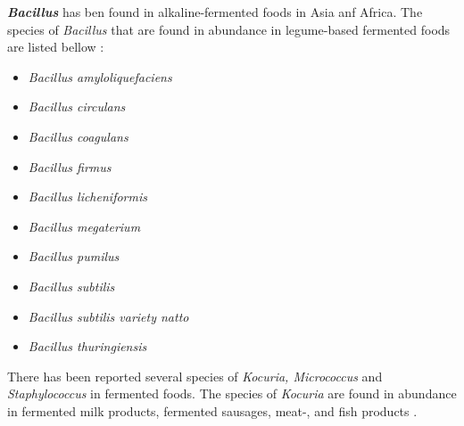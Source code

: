 \textbf{\textit{Bacillus}} has ben found in alkaline-fermented foods in Asia anf Africa. The species of \textit{Bacillus} that are found in abundance in legume-based fermented foods are listed bellow \cite*{L1-DiversityMicro}:

\begin{highlight}
    \begin{multicols}{3}
        \begin{itemize}
            \item \textit{Bacillus amyloliquefaciens}
            \item \textit{Bacillus circulans}
            \item \textit{Bacillus coagulans}
            \item \textit{Bacillus firmus}
            \item \textit{Bacillus licheniformis}
            \item \textit{Bacillus megaterium}
            \item \textit{Bacillus pumilus}
            \item \textit{Bacillus subtilis}
            \item \textit{Bacillus subtilis variety natto}
            \item \textit{Bacillus thuringiensis}            
        \end{itemize}
    \end{multicols}
\end{highlight}

There has been reported several species of \textit{Kocuria, Micrococcus} and \textit{Staphylococcus} in fermented foods. The species of \textit{Kocuria} are found in abundance in fermented milk products, fermented sausages, meat-, and fish products \cite*{L1-DiversityMicro}.

\vspace{1em}

